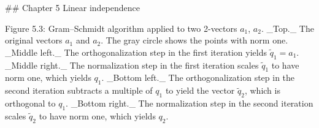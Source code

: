 

## Chapter 5 Linear independence

Figure 5.3: Gram–Schmidt algorithm applied to two 2-vectors \(a_{1}\), \(a_{2}\). _Top._ The original vectors \(a_{1}\) and \(a_{2}\). The gray circle shows the points with norm one. _Middle left._ The orthogonalization step in the first iteration yields \(\tilde{q}_{1}=a_{1}\). _Middle right._ The normalization step in the first iteration scales \(\tilde{q}_{1}\) to have norm one, which yields \(q_{1}\). _Bottom left._ The orthogonalization step in the second iteration subtracts a multiple of \(q_{1}\) to yield the vector \(\tilde{q}_{2}\), which is orthogonal to \(q_{1}\). _Bottom right._ The normalization step in the second iteration scales \(\tilde{q}_{2}\) to have norm one, which yields \(q_{2}\).

